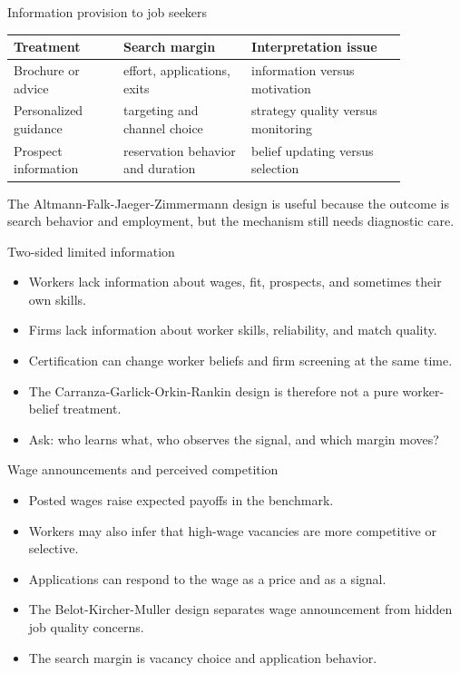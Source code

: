 \documentclass[aspectratio=169,11pt]{beamer}
\begin{document}
\begin{frame}{Information provision to job seekers}
\small
\begin{tabular}{p{0.24\linewidth} p{0.28\linewidth} p{0.34\linewidth}}
\toprule
Treatment & Search margin & Interpretation issue \\
\midrule
Brochure or advice & effort, applications, exits & information versus motivation \\
Personalized guidance & targeting and channel choice & strategy quality versus monitoring \\
Prospect information & reservation behavior and duration & belief updating versus selection \\
\bottomrule
\end{tabular}

\vspace{0.6em}
The Altmann-Falk-Jaeger-Zimmermann design is useful because the outcome is search behavior and employment, but the mechanism still needs diagnostic care.
\end{frame}

\begin{frame}{Two-sided limited information}
\begin{itemize}
    \item Workers lack information about wages, fit, prospects, and sometimes their own skills.
    \item Firms lack information about worker skills, reliability, and match quality.
    \item Certification can change worker beliefs and firm screening at the same time.
    \item The Carranza-Garlick-Orkin-Rankin design is therefore not a pure worker-belief treatment.
    \item Ask: who learns what, who observes the signal, and which margin moves?
\end{itemize}
\end{frame}

\begin{frame}{Wage announcements and perceived competition}
\begin{itemize}
    \item Posted wages raise expected payoffs in the benchmark.
    \item Workers may also infer that high-wage vacancies are more competitive or selective.
    \item Applications can respond to the wage as a price and as a signal.
    \item The Belot-Kircher-Muller design separates wage announcement from hidden job quality concerns.
    \item The search margin is vacancy choice and application behavior.
\end{itemize}
\end{frame}
\end{document}
